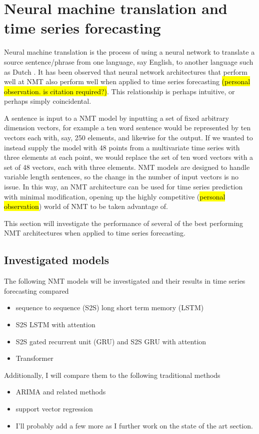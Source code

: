 \section{Neural machine translation and time series forecasting}
Neural machine translation is the process of using a neural network to translate a source sentence/phrase from one language, say English, to another language such as Dutch \citep{Cho2014}.
It has been observed that neural network architectures that perform well at NMT also perform well when applied to time series forecasting \hl{(personal observation. is citation required?)}.
This relationship is perhaps intuitive, or perhaps simply coincidental.
\par
A sentence is input to a NMT model by inputting a set of fixed arbitrary dimension vectors, for example a ten word sentence would be represented by ten vectors each with, say, 250 elements, and likewise for the output.
If we wanted to instead supply the model with 48 points from a multivariate time series with three elements at each point, we would replace the set of ten word vectors with a set of 48 vectors, each with three elements.
NMT models are designed to handle variable length sentences, so the change in the number of input vectors is no issue.
In this way, an NMT architecture can be used for time series prediction with minimal modification, opening up the highly competitive (\hl{personal observation}) world of NMT to be taken advantage of.
\par
This section will investigate the performance of several of the best performing NMT architectures when applied to time series forecasting.

\subsection{Investigated models}
The following NMT models will be investigated and their results in time series forecasting compared
\begin{itemize}
	\item sequence to sequence (S2S) \citep{Cho2014a} long short term memory (LSTM) \citep{hochreiter1997long}
	\item S2S LSTM with attention \citep{luong2015effective}
	\item S2S gated recurrent unit (GRU) \citep{Cho2014a} and S2S GRU with attention
	\item Transformer \citep{Vaswani2017}
\end{itemize}

Additionally, I will compare them to the following traditional methods
\begin{itemize}
	\item ARIMA and related methods
	\item support vector regression
	\item I'll probably add a few more as I further work on the state of the art section.
\end{itemize}

